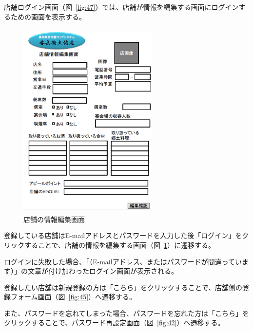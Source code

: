 \documentclass[a4j,titlepage]{jarticle}
\begin{document}
店舗ログイン画面（図~\ref{fig:47}）では、店舗が情報を編集する画面にログインするための画面を表示する。



\begin {figure}[!htbp]
    \begin{center}
    \includegraphics [height=10cm, width=7cm]{48.eps}
    \caption {店舗の情報編集画面}
    \label {fig:48}
    \end{center}
\end {figure}



登録している店舗はE-mailアドレスとパスワードを入力した後「ログイン」をクリックすることで、店舗の情報を編集する画面（図~\ref{fig:48}）に遷移する。



ログインに失敗した場合、「（E-mailアドレス、またはパスワードが間違っています）」の文章が付け加わったログイン画面が表示される。



登録したい店舗は新規登録の方は「こちら」をクリックすることで、店舗側の登録フォーム画面（図~\ref{fig:45}）へ遷移する。



また、パスワードを忘れてしまった場合、パスワードを忘れた方は「こちら」をクリックすることで、パスワード再設定画面（図~\ref{fig:42}）へ遷移する。


\clearpage
\end{document}
